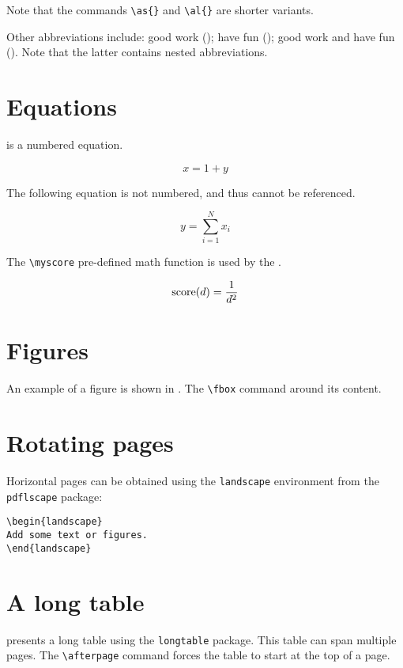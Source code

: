 Note that the commands \verb+\as{}+ and \verb+\al{}+ are shorter variants.

Other abbreviations include: good work (); have fun (); good work and have fun ().
Note that the latter contains nested abbreviations.


\section{Equations}
\label{c2:s:equations}

 is a numbered equation.

\begin{equation}
\label{eq:example1}
x = 1 + y
\end{equation}

The following equation is not numbered, and thus cannot be referenced.

\begin{equation*}
y = \sum_{i=1}^{N}{x_i}
\end{equation*}

The \verb+\myscore+ pre-defined math function is used by the .

\begin{equation}
\label{eq:example2}
\operatorname{score}(d) = \frac{1}{d^2}
\end{equation}


\section{Figures}
\label{c2:s:figures}

An example of a figure is shown in . The \verb+\fbox+ command  around its content.




\section{Rotating pages}
\label{c2:s:rotating-pages}

Horizontal pages can be obtained using the \verb+landscape+ environment  from the \verb+pdflscape+ package:

\begin{verbatim}
\begin{landscape}
Add some text or figures.
\end{landscape}
\end{verbatim}


\section{A long table}
\label{c2:s:a-long-table}

 presents a long table using the \verb+longtable+ package.
This table can span multiple pages.
The \verb+\afterpage+ command forces the table to start at the top of a page.

\afterpage{}
